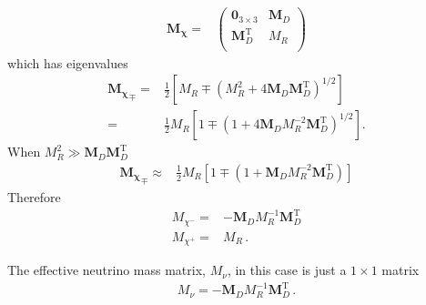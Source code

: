\begin{align}
  \boldsymbol{M_{\chi}}=& \begin{pmatrix}
   \mathbf{0}_{3 \times 3} &            \boldsymbol{M}_D \\
   \boldsymbol{M}_D^{\operatorname{T}} & M_R \\
 \end{pmatrix}
\end{align}
which has eigenvalues
\begin{align}
{  \boldsymbol{M_{\chi}}}_\mp=&\frac{1}{2} \left[ M_R \mp \left( M_R^2 + 4   \boldsymbol{M}_D   \boldsymbol{M}_D^{\operatorname{T}}  \right)^{1/2} \right] \nonumber\\
  =&\frac{1}{2} M_R\left[ 1 \mp  \left( 1 + 4   \boldsymbol{M}_D M_R^{-2}   \boldsymbol{M}_D ^{\operatorname{T}}  \right)^{1/2} \right].
\end{align}
When $M_R^2 \gg \boldsymbol{M}_D  \boldsymbol{M}_D ^{\operatorname{T}} $
\begin{align}
  { \boldsymbol{M_{\chi}}}_\mp\approx &\frac{1}{2} M_R\left[ 1 \mp  \left( 1 +    \boldsymbol{M}_D M_R^{-2}   \boldsymbol{M}_D^{\operatorname{T}}  \right)
   \right]
\end{align}
Therefore
\begin{align}
 M_{\chi^-} =&-   \boldsymbol{M}_D M_R^{-1}   \boldsymbol{M}_D^{\operatorname{T}}  \nonumber\\
 M_{\chi^+} =&    M_R\,.
\end{align}

The effective neutrino mass matrix, $M_{\nu}$,  in this case   is just a $1\times 1$ matrix
\begin{align}
  M_{\nu}=- \boldsymbol{M}_D M_R^{-1} \boldsymbol{M}_D^{\operatorname{T}}\,.
\end{align}


